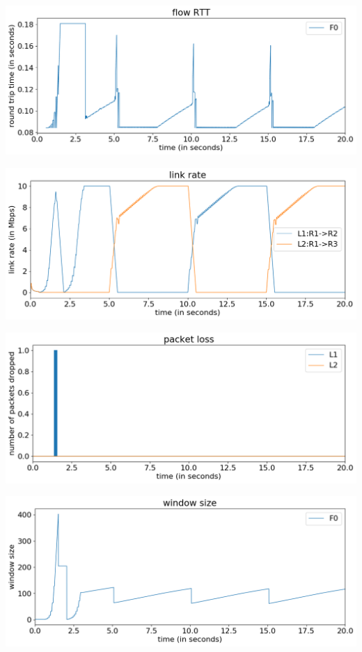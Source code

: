 \documentclass{article}
\begin{document}
\includegraphics[width = \textwidth]{"test_case1_reno flow RTT"}

\includegraphics[width = \textwidth]{"test_case1_reno link rate"}

\includegraphics[width = \textwidth]{"test_case1_reno packet loss"}

\includegraphics[width = \textwidth]{"test_case1_reno window size"}
\end{document}
